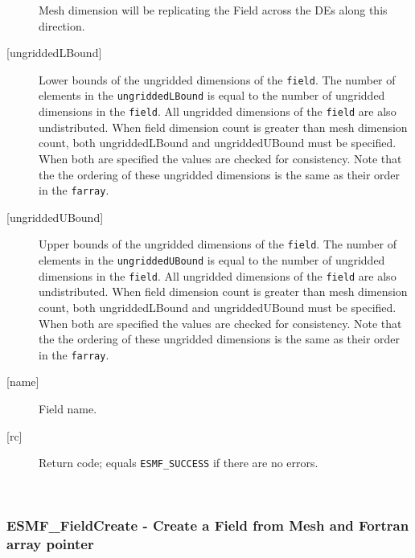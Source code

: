 \begin{description}
   Mesh dimension will be replicating the Field across the DEs along 
   this direction. 
   \item [{[ungriddedLBound]}] 
   Lower bounds of the ungridded dimensions of the {\tt field}. 
   The number of elements in the {\tt ungriddedLBound} is equal to the number of ungridded 
   dimensions in the {\tt field}. All ungridded dimensions of the 
   {\tt field} are also undistributed. When field dimension count is 
   greater than mesh dimension count, both ungriddedLBound and ungriddedUBound 
   must be specified. When both are specified the values are checked 
   for consistency. Note that the the ordering of 
   these ungridded dimensions is the same as their order in the {\tt farray}. 
   \item [{[ungriddedUBound]}] 
   Upper bounds of the ungridded dimensions of the {\tt field}. 
   The number of elements in the {\tt ungriddedUBound} is equal to the number of ungridded 
   dimensions in the {\tt field}. All ungridded dimensions of the 
   {\tt field} are also undistributed. When field dimension count is 
   greater than mesh dimension count, both ungriddedLBound and ungriddedUBound 
   must be specified. When both are specified the values are checked 
   for consistency. Note that the the ordering of 
   these ungridded dimensions is the same as their order in the {\tt farray}. 
   \item [{[name]}] 
   Field name. 
   \item [{[rc]}] 
   Return code; equals {\tt ESMF\_SUCCESS} if there are no errors. 
   \end{description} 
    
 
\mbox{}\hrulefill\ 
 
\subsubsection [ESMF\_FieldCreate] {ESMF\_FieldCreate - Create a Field from Mesh and Fortran array pointer }


